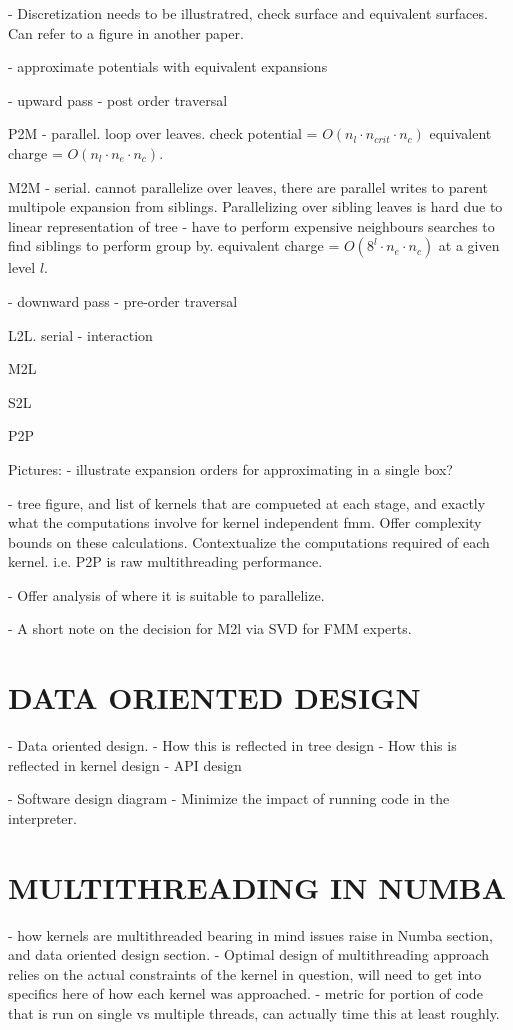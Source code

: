 \documentclass{IEEEcsmag}
\begin{document}
- Discretization needs to be illustratred, check surface and equivalent surfaces. Can refer to a figure in another paper.

- approximate potentials with equivalent expansions

- upward pass - post order traversal

P2M 
- parallel. loop over leaves. check potential = $O(n_l \cdot n_{crit} \cdot n_c)$ equivalent charge = $O(n_l \cdot n_e \cdot  n_c)$.

M2M
- serial. cannot parallelize over leaves, there are parallel writes to parent multipole expansion from siblings. Parallelizing over sibling leaves is hard due to linear representation of tree - have to perform expensive neighbours searches to find siblings to perform group by. equivalent charge = $O(8^l \cdot n_e \cdot n_c)$ at a given level $l$.

- downward pass - pre-order traversal

L2L. serial - interaction

M2L 

S2L 

P2P

Pictures:
- illustrate expansion orders for approximating in a single box?

- tree figure, and list of kernels that are compueted at each stage, and exactly what the computations involve for kernel independent fmm. Offer complexity bounds on these calculations. Contextualize the computations required of each kernel. i.e. P2P is raw multithreading performance.

- Offer analysis of where it is suitable to parallelize.

- A short note on the decision for M2l via SVD for FMM experts.

\section{DATA ORIENTED DESIGN}

- Data oriented design.
	- How this is reflected in tree design
	- How this is reflected in kernel design
	- API design

- Software design diagram
	- Minimize the impact of running code in the interpreter.

\section{MULTITHREADING IN NUMBA}

- how kernels are multithreaded bearing in mind issues raise in Numba section, and data oriented design section.
- Optimal design of multithreading approach relies on the actual constraints of the kernel in question, will need to get into specifics here of how each kernel was approached.
- metric for portion of code that is run on single vs multiple threads, can actually time this at least roughly.
\end{document}
